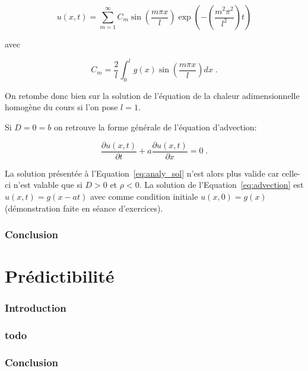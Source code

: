 \documentclass[a4paper, 12pt]{report}
\begin{document}
 \begin{equation}
   u(x,t) = \sum_{m=1}^{\infty} C_m \sin \left (\frac{m \pi x}{l} \right ) \exp \left ( - \left (\frac{m^2 \pi^2}{l^2} \right ) t \right )
 \end{equation}

 avec

 \begin{equation}
   C_m = \frac{2}{l} \int_0^l g(x) \sin \left (\frac{m \pi x}{l} \right )  dx \;.
 \end{equation}

 On retombe donc bien sur la solution de l'équation de la chaleur adimensionnelle
 homogène du cours si l'on pose $l=1$.

Si $D=0=b$ on retrouve la forme générale de l'équation d'advection:

\begin{equation}
  \frac{\partial u(x,t)}{\partial t} + a \frac{\partial u(x,t)}{\partial x} = 0 \;.
  \label{eq:advection}
\end{equation}

La solution présentée à l'Equation~\ref{eq:analy_sol} n'est alors plus valide
car celle-ci n'est valable que si $D>0$ et $\rho < 0$. La solution de
l'Equation~\ref{eq:advection} est $u(x,t) = g(x-at)$ avec comme condition
initiale $u(x,0) = g(x)$ (démonstration faite en séance d'exercices).



\section*{Conclusion}

\part{Prédictibilité}


\section*{Introduction}


\section{todo}


\section*{Conclusion}
\end{document}
